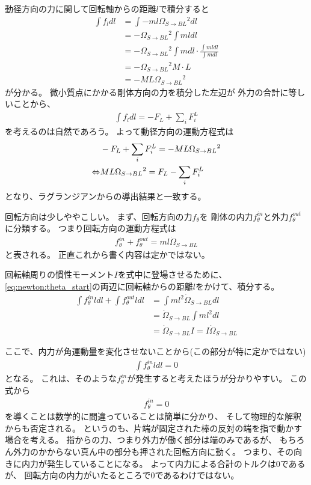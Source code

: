 \documentclass[a4paper,11pt]{jsarticle}
\begin{document}
動径方向の力に関して回転軸からの距離$l$で積分すると
\begin{align*}
  \int f_l dl 
  &= \int -ml\Omega_{S\rightarrow BL}{}^2 dl
  \\
  &= -\Omega_{S\rightarrow BL}{}^2 \int ml dl
  \\
  &= -\Omega_{S\rightarrow BL}{}^2 \int m dl \cdot \frac{ \int ml dl }{\int m dl }
  \\
  &= -\Omega_{S\rightarrow BL}{}^2 M \cdot L
  \\
  &= -ML\Omega_{S\rightarrow BL}{}^2
\end{align*}
が分かる。
微小質点にかかる剛体方向の力を積分した左辺が
外力の合計に等しいことから、
\begin{align*}
  \int f_l dl = -F_L + \sum_i F_i^{L}
\end{align*}
を考えるのは自然であろう。
よって動径方向の運動方程式は
\begin{align}
  & -F_L + \sum_i F_i^{L} = -ML\Omega_{S\rightarrow BL}{}^2
  \notag
  \\
  \Leftrightarrow
  & ML\Omega_{S\rightarrow BL}{}^2 = F_L - \sum_i F_i^{L}
  \label{eq:newton:length_end}
\end{align}
となり、ラグランジアンからの導出結果と一致する。

回転方向は少しややこしい。
まず、回転方向の力$f_\theta$を
剛体の内力$f_\theta^{in}$と外力$f_\theta^{out}$に分類する。
つまり回転方向の運動方程式は
\begin{align}
  f_\theta^{in} + f_\theta^{out} = ml\dot\Omega_{S\rightarrow BL}{}
  \label{eq:newton:theta_start}
\end{align}
と表される。
正直これから書く内容は定かではない。

回転軸周りの慣性モーメント$I$を式中に登場させるために、
\ref{eq:newton:theta_start}の両辺に回転軸からの距離$l$をかけて、積分する。
\begin{align*}
  \int f_\theta^{in} l dl + \int f_\theta^{out} l dl
  &= \int ml^2\dot\Omega_{S\rightarrow BL}{} dl
  \\
  &= \dot\Omega_{S\rightarrow BL}{}\int ml^2 dl
  \\
  &= \dot\Omega_{S\rightarrow BL}{} I = I\dot\Omega_{S\rightarrow BL}{}
\end{align*}

ここで、内力が角運動量を変化させないことから(この部分が特に定かではない)
\begin{align*}
  \int f_\theta^{in} l dl = 0
\end{align*}
となる。
これは、そのような$f_\theta^{in}$が発生すると考えたほうが分かりやすい。
この式から
\begin{align*}
  f_\theta^{in} = 0
\end{align*}
を導くことは数学的に間違っていることは簡単に分かり、
そして物理的な解釈からも否定される。
というのも、片端が固定された棒の反対の端を指で動かす場合を考える。
指からの力、つまり外力が働く部分は端のみであるが、
もちろん外力のかからない真ん中の部分も押された回転方向に動く。
つまり、その向きに内力が発生していることになる。
よって内力による合計のトルクは0であるが、
回転方向の内力がいたるところで0であるわけではない。
\end{document}

